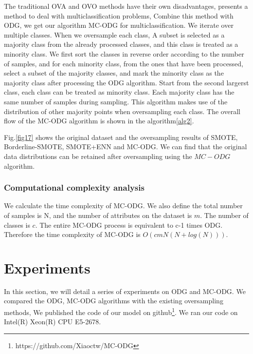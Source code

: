 \documentclass[runningheads]{llncs}
\begin{document}
The traditional OVA and OVO methods have their own disadvantages, 
\cite{2020Combined,2019Radial} presents a method to deal with multiclassification problems,
Combine this method with ODG, we get our algorithm MC-ODG for multiclassification.
We iterate over multiple classes. When we oversample each class,
A subset is selected as a majority class from the already processed classes, 
and this class is treated as a minority class.
We first sort the classes in reverse order according to the number of samples, and for each minority class, 
from the ones that have been processed,
select a subset of the majority classes, and mark the minority class as the majority class 
after processing the ODG algorithm.
Start from the second largerst class, each class can be treated as minority class.
Each majority class has the same number of samples during sampling.
This algorithm makes use of the distribution of 
other majority points when oversampling each class.
The overall flow of the MC-ODG algorithm is shown in the algorithm\ref{alg2}.


 Fig.\ref{fig17} shows the original dataset and the oversampling results of SMOTE, Borderline-SMOTE,
 SMOTE+ENN and MC-ODG. We can find that the original data distributions 
 can be retained after oversampling using the $MC-ODG$ algorithm.

 \subsubsection{Computational complexity analysis}
We calculate the time complexity of MC-ODG.
 We also define the total number of samples is N, and the number of attributes on the dataset is $m$.
 The number of classes is $c$. The entire MC-ODG process is equivalent to c-1 times ODG.
 Therefore the time complexity of MC-ODG is $O(cmN(N+log(N)))$.
\section{Experiments}
In this section, we will detail a series of experiments on ODG and MC-ODG.
We compared the ODG, MC-ODG algorithms with the existing oversampling methods,
We published the code of our model on github\footnote{https://github.com/Xiaoctw/MC-ODG}.
We ran our code on Intel(R) Xeon(R) CPU E5-2678.
\end{document}
